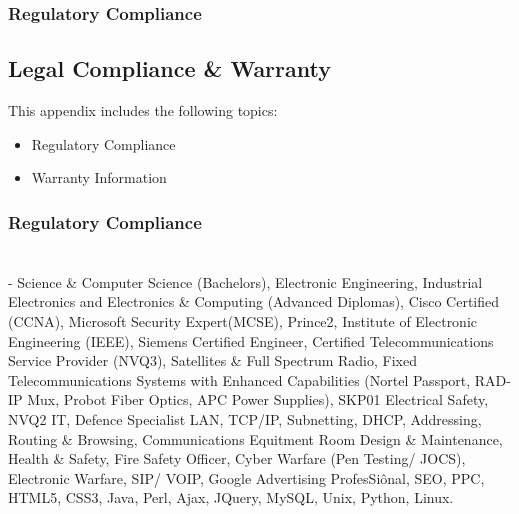 \documentclass[letterpaper,10pt,english]{sphinxmanual}
\begin{document}
\subsubsection{Regulatory Compliance}
\label{\detokenize{advisoryservice:regulatory-compliance}}

\subsection{Legal Compliance \& Warranty}
\label{\detokenize{legalandaccounting:legal-compliance-warranty}}\label{\detokenize{legalandaccounting::doc}}
This appendix includes the following topics:
\begin{itemize}
\item {} 
Regulatory Compliance

\item {} 
Warranty Information

\end{itemize}


\subsubsection{Regulatory Compliance}
\label{\detokenize{legalandaccounting:regulatory-compliance}}

\section{}
\label{\detokenize{index:document-author-s}}
 - Science \& Computer Science (Bachelors), Electronic Engineering, Industrial Electronics and Electronics \& Computing (Advanced Diplomas), Cisco Certified (CCNA), Microsoft Security Expert(MCSE), Prince2, Institute of Electronic Engineering (IEEE), Siemens Certified Engineer, Certified Telecommunications Service Provider (NVQ3), Satellites \& Full Spectrum Radio, Fixed Telecommunications Systems with Enhanced Capabilities (Nortel Passport, RAD-IP Mux, Probot Fiber Optics, APC Power Supplies), SKP01 Electrical Safety, NVQ2 IT, Defence Specialist LAN, TCP/IP, Subnetting, DHCP, Addressing, Routing \& Browsing, Communications Equitment Room Design \& Maintenance, Health \& Safety, Fire Safety Officer, Cyber Warfare (Pen Testing/ JOCS), Electronic Warfare, SIP/ VOIP, Google Advertising ProfesSiônal, SEO, PPC, HTML5, CSS3, Java, Perl, Ajax, JQuery, MySQL, Unix, Python, Linux.
\end{document}
